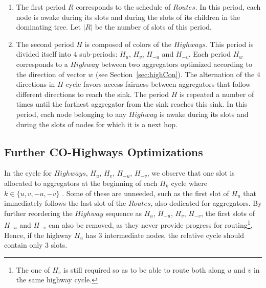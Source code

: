 \begin{enumerate}
\item The first period $R$ corresponds to the schedule 
of $Routes$. In this period, each node is awake during its slots and during the slots of its children in the dominating tree. Let $|R|$ be the number of slots of this period.
\item The second period $H$ is composed of colors of the $Highways$. This period is divided itself into $4$ sub-periods: $H_u$, $H_v$, $H_{-u}$ and $H_{-v}$. Each period $H_w$ corresponds to a $Highway$ between two aggregators optimized according to the direction of vector $w$ (see Section~\ref{sec:highCon}). The alternation of the $4$ directions in $H$ cycle favors access fairness between aggregators that follow different directions to reach the sink. 
The period $H$ is repeated a number of times until the farthest aggregator from the sink reaches this sink. In this period, each node belonging to any $Highway$ is awake during its slots and during the slots of nodes for which it is a next hop. \end{enumerate}


\subsection{Further CO-Highways Optimizations}\label{sec:highway-opt}
In the cycle for $Highways$, $H_u$, $H_v$, $H_{-u}$, $H_{-v}$, we observe
that one slot is allocated to aggregators at the beginning of each $H_k$ cycle where $k \in\{u,v,-u,-v\}$
. Some of these are unneeded, such as the first slot of $H_u$ 
that immediately follows the last slot of the $Routes$, also dedicated for
aggregators.
By further reordering the $Highway$ sequence as $H_u$, $H_{-u}$, $H_v$, $H_{-v}$,
the first slots of $H_{-u}$ and $H_{-v}$ can also be 
removed, as they never provide progress for routing\footnote{The one of $H_v$ is still required so as to be able to route both along $u$ and $v$ in the same highway cycle.}. Hence, if the highway $H_u$ has 3 intermediate nodes, the relative cycle should contain only 3 slots.



